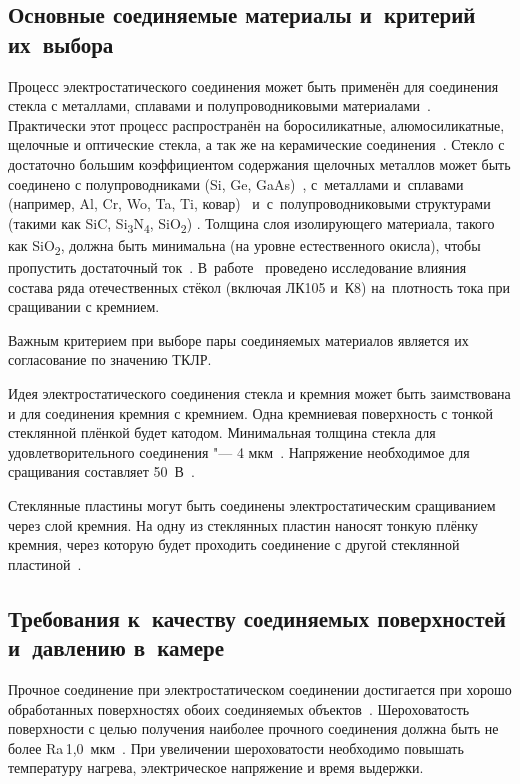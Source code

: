 \subsection{Основные соединяемые материалы и~критерий их~выбора}
\begingroup
Процесс электростатического соединения может быть применён для
соединения стекла с металлами, сплавами и полупроводниковыми
материалами~\cite{wallis_pomerantz1969fagms}. Практически этот процесс
распространён на боросиликатные, алюмосиликатные, щелочные и
оптические стекла, а так же на керамические
соединения~\cite{wallis_pomerantz1969fagms}. Стекло с достаточно
большим коэффициентом содержания щелочных металлов может быть
соединено с полупроводниками (Si, Ge,
GaAs)~\cite{wallis_pomerantz1969fagms,
Khomenko1996pyrex}, с~металлами и~сплавами (например, Al, Cr, Wo, Ta,
Ti, ковар)~\cite{Khandan2014titanium_ab}
и~с~полупроводниковыми структурами (такими как SiC,
Si\textsubscript{3}N\textsubscript{4}, SiO\textsubscript{2})
\cite{stoger1999awbtech}. Толщина слоя изолирующего материала, такого
как SiO\textsubscript{2}, должна быть минимальна (на уровне
естественного окисла), чтобы пропустить достаточный
ток~\cite{stoger1999awbtech}.
В~работе~\cite{djachkov2000_avtoref} проведено исследование влияния состава ряда отечественных стёкол (включая ЛК105 и~К8) на~плотность тока при сращивании с кремнием.\russianpar
\endgroup

Важным критерием при выборе пары соединяемых материалов является их согласование по значению ТКЛР.

Идея электростатического соединения стекла и кремния может быть заимствована и для соединения кремния с кремнием. Одна кремниевая поверхность с тонкой стеклянной плёнкой будет катодом. Минимальная толщина стекла для удовлетворительного соединения "--- 4 мкм~\cites[487]{lit_madou2002fundamentals}{Wallis_FAGS_1975}. Напряжение необходимое для сращивания составляет 50~В~\cite{Wallis_FAGS_1975}.

Стеклянные пластины могут быть соединены электростатическим сращиванием через слой кремния. На одну из стеклянных пластин наносят тонкую плёнку кремния, через которую будет проходить соединение с другой стеклянной пластиной~\cite{terazaki2012stack_structure_patent}.

\subsection{Требования к~качеству соединяемых поверхностей и~давлению в~камере}
Прочное соединение при электростатическом соединении достигается при хорошо обработанных поверхностях обоих соединяемых объектов~\cite{Wallis_FAGS_1975}. Шероховатость поверхности с целью получения наиболее прочного соединения должна быть не более Ra\,1,0~мкм~\cites[484]{lit_madou2002fundamentals}.
При увеличении шероховатости необходимо повышать температуру нагрева, электрическое напряжение и время выдержки.

